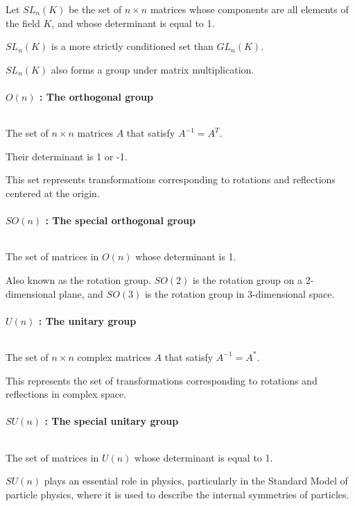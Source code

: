 \documentclass[uplatex,a4j,12pt,dvipdfmx]{jsarticle}
\begin{document}
Let $SL_{n}(K)$ be the set of $n \times n$ matrices whose components are all elements of the field $K$, and whose determinant is equal to 1.

$SL_{n}(K)$ is a more strictly conditioned set than $GL_{n}(K)$.

$SL_{n}(K)$ also forms a group under matrix multiplication.

\paragraph{$O(n)$ : The orthogonal group}

${}$

The set of $n \times n$ matrices $A$ that satisfy $A^{-1} = A^{T}$.

Their determinant is 1 or -1.

This set represents transformations corresponding to rotations and reflections centered at the origin.

\paragraph{$SO(n)$ : The special orthogonal group}

${}$

The set of matrices in $O(n)$ whose determinant is 1.

Also known as the rotation group.
$SO(2)$ is the rotation group on a 2-dimensional plane, and
$SO(3)$ is the rotation group in 3-dimensional space.

\paragraph{$U(n)$ : The unitary group}

${}$

The set of $n \times n$ complex matrices $A$ that satisfy $A^{-1} = A^{*}$.

This represents the set of transformations corresponding to rotations and reflections in complex space.

\paragraph{$SU(n)$ : The special unitary group}

${}$

The set of matrices in $U(n)$ whose determinant is equal to 1.

$SU(n)$ plays an essential role in physics, particularly in the Standard Model of particle physics, where it is used to describe the internal symmetries of particles.
\end{document}
